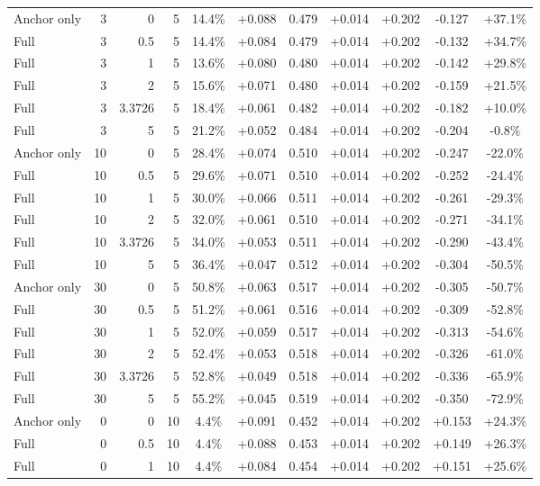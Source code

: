 \begin{table}[htbp]
\begin{tabular}{lrrrccccccc}
Anchor only & 3 & 0 & 5 & 14.4\% & +0.088 & 0.479 & +0.014 & +0.202 & -0.127 & +37.1\% \\
Full & 3 & 0.5 & 5 & 14.4\% & +0.084 & 0.479 & +0.014 & +0.202 & -0.132 & +34.7\% \\
Full & 3 & 1 & 5 & 13.6\% & +0.080 & 0.480 & +0.014 & +0.202 & -0.142 & +29.8\% \\
Full & 3 & 2 & 5 & 15.6\% & +0.071 & 0.480 & +0.014 & +0.202 & -0.159 & +21.5\% \\
Full & 3 & 3.3726 & 5 & 18.4\% & +0.061 & 0.482 & +0.014 & +0.202 & -0.182 & +10.0\% \\
Full & 3 & 5 & 5 & 21.2\% & +0.052 & 0.484 & +0.014 & +0.202 & -0.204 & -0.8\% \\
Anchor only & 10 & 0 & 5 & 28.4\% & +0.074 & 0.510 & +0.014 & +0.202 & -0.247 & -22.0\% \\
Full & 10 & 0.5 & 5 & 29.6\% & +0.071 & 0.510 & +0.014 & +0.202 & -0.252 & -24.4\% \\
Full & 10 & 1 & 5 & 30.0\% & +0.066 & 0.511 & +0.014 & +0.202 & -0.261 & -29.3\% \\
Full & 10 & 2 & 5 & 32.0\% & +0.061 & 0.510 & +0.014 & +0.202 & -0.271 & -34.1\% \\
Full & 10 & 3.3726 & 5 & 34.0\% & +0.053 & 0.511 & +0.014 & +0.202 & -0.290 & -43.4\% \\
Full & 10 & 5 & 5 & 36.4\% & +0.047 & 0.512 & +0.014 & +0.202 & -0.304 & -50.5\% \\
Anchor only & 30 & 0 & 5 & 50.8\% & +0.063 & 0.517 & +0.014 & +0.202 & -0.305 & -50.7\% \\
Full & 30 & 0.5 & 5 & 51.2\% & +0.061 & 0.516 & +0.014 & +0.202 & -0.309 & -52.8\% \\
Full & 30 & 1 & 5 & 52.0\% & +0.059 & 0.517 & +0.014 & +0.202 & -0.313 & -54.6\% \\
Full & 30 & 2 & 5 & 52.4\% & +0.053 & 0.518 & +0.014 & +0.202 & -0.326 & -61.0\% \\
Full & 30 & 3.3726 & 5 & 52.8\% & +0.049 & 0.518 & +0.014 & +0.202 & -0.336 & -65.9\% \\
Full & 30 & 5 & 5 & 55.2\% & +0.045 & 0.519 & +0.014 & +0.202 & -0.350 & -72.9\% \\
Anchor only & 0 & 0 & 10 & 4.4\% & +0.091 & 0.452 & +0.014 & +0.202 & +0.153 & +24.3\% \\
Full & 0 & 0.5 & 10 & 4.4\% & +0.088 & 0.453 & +0.014 & +0.202 & +0.149 & +26.3\% \\
Full & 0 & 1 & 10 & 4.4\% & +0.084 & 0.454 & +0.014 & +0.202 & +0.151 & +25.6\% \\

\end{tabular}
\end{table}
